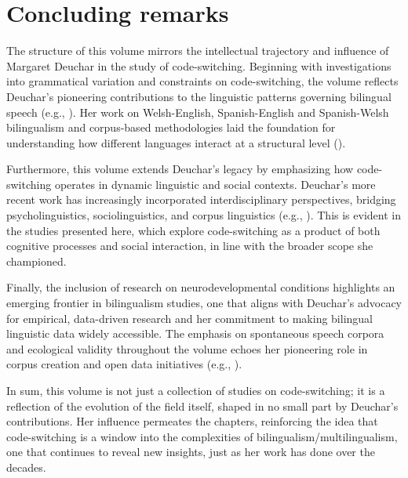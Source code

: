 \documentclass[output=paper]{langscibook}
\begin{document}
\section{Concluding remarks}

The structure of this volume mirrors the intellectual trajectory and influence of Margaret Deuchar in the study of code-switching. Beginning with investigations into grammatical variation and constraints on code-switching, the volume reflects Deuchar’s pioneering contributions to the linguistic patterns governing bilingual speech (e.g., \citealt{Deuchar2006, DeucharEtAl2007}). Her work on Welsh-English, Spanish-English and Spanish-Welsh bilingualism and corpus-based methodologies laid the foundation for understanding how different languages interact at a structural level (\citealt{Bangortalknodate, Deuchar2020}).

Furthermore, this volume extends Deuchar’s legacy by emphasizing how code-switching operates in dynamic linguistic and social contexts. Deuchar’s more recent work has increasingly incorporated interdisciplinary perspectives, bridging psycholinguistics, sociolinguistics, and corpus linguistics (e.g., \citealt{Vaughan-EvansEtAl2020}). This is evident in the studies presented here, which explore code-switching as a product of both cognitive processes and social interaction, in line with the broader scope she championed.

Finally, the inclusion of research on neurodevelopmental conditions highlights an emerging frontier in bilingualism studies, one that aligns with Deuchar’s advocacy for empirical, data-driven research and her commitment to making bilingual linguistic data widely accessible. The emphasis on spontaneous speech corpora and ecological validity throughout the volume echoes her pioneering role in corpus creation and open data initiatives (e.g., \citealt{DeucharEtAl2014,DeucharEtAl2018}).

In sum, this volume is not just a collection of studies on code-switching; it is a reflection of the evolution of the field itself, shaped in no small part by Deuchar’s contributions. Her influence permeates the chapters, reinforcing the idea that code-switching is a window into the complexities of bilingualism/multilingualism, one that continues to reveal new insights, just as her work has done over the decades.

\sloppy\printbibliography[heading=subbibliography,notkeyword=this]
\end{document}

